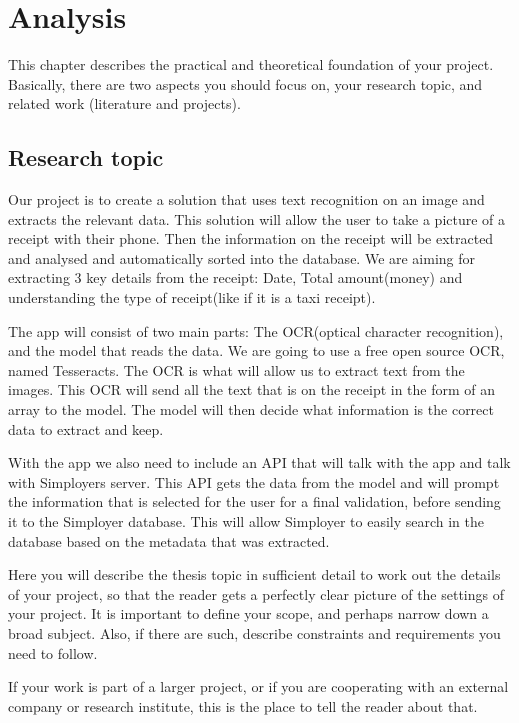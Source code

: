 \cleardoublepage
\chapter{Analysis}
\label{ch:analysis}

This chapter describes the practical and theoretical foundation of your project.
Basically, there are two aspects you should focus on, your research topic, and related work (literature and projects).

\section{Research topic}\label{sec:research-topic}

Our project is to create a solution that uses text recognition on an image and extracts the relevant data.
This solution will allow the user to take a picture of a receipt with their phone.
Then the information on the receipt will be extracted and analysed and automatically sorted into the database.
We are aiming for extracting 3 key details from the receipt: Date, Total amount(money) and understanding the type of receipt(like if it is a taxi receipt).

The app will consist of two main parts: The OCR(optical character recognition), and the model that reads the data.
We are going to use a free open source OCR, named Tesseracts.
The OCR is what will allow us to extract text from the images.
This OCR will send all the text that is on the receipt in the form of an array to the model.
The model will then decide what information is the correct data to extract and keep.

With the app we also need to include an API that will talk with the app and talk with Simployers server.
This API gets the data from the model and will prompt the information that is selected for the user for a final
validation, before sending it to the Simployer database.
This will allow Simployer to easily search in the database based on the metadata that was extracted.

Here you will describe the thesis topic in sufficient detail to work out the details of your project, so that the reader gets a perfectly clear picture of the settings of your project.
It is important to define your scope, and perhaps narrow down a broad subject.
Also, if there are such, describe constraints and requirements you need to follow.

If your work is part of a larger project, or if you are cooperating with an external company or research institute, this is the place to tell the reader about that.

